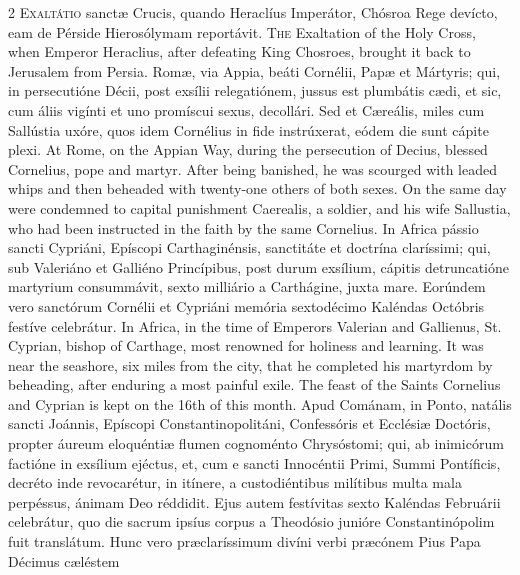 \begin{paracol}{2}
\lettrine[lines=2]{E}{xaltátio} sanctæ Crucis, quando Heracl\'ius Imperátor, Chósroa Rege devícto, eam de Pérside Hierosólymam reportávit.
\switchcolumn
{}
\lettrine[lines=2]{T}{he} Exaltation of the Holy Cross, 
 when Emperor Heraclius, after defeating King Chosroes, brought it back to 
 Jerusalem from Persia.
\switchcolumn*
{}
Romæ, via Appia, beáti 
 Cornélii, Papæ et Mártyris; qui, in persecutióne Décii, post exsílii 
 relegatiónem, jussus est plumbátis cædi, et sic, cum áliis vigínti et uno 
 promíscui sexus, decollári. Sed et Cæreális, miles cum Sallústia uxóre, 
 quos idem Cornélius in fide instrúxerat, eódem die sunt cápite plexi.
\switchcolumn
{}
At Rome, on the Appian Way, during 
 the persecution of Decius, blessed Cornelius, pope and martyr. After 
 being banished, he was scourged with leaded whips and then beheaded with 
 twenty-one others of both sexes. On the same day were condemned to 
 capital punishment Caerealis, a soldier, and his wife Sallustia, who had 
 been instructed in the faith by the same Cornelius.
\switchcolumn*
{}
In Africa pássio sancti 
 Cypriáni, Epíscopi Carthaginénsis, sanctitáte et doctrína claríssimi; qui, 
 sub Valeriáno et Galliéno Princípibus, post durum exsílium, cápitis 
 detruncatióne martyrium consummávit, sexto milliário a Carthágine, juxta 
 mare. Eorúndem vero sanctórum Cornélii et Cypriáni memória sextodécimo 
 Kaléndas Octóbris festíve celebrátur.
\switchcolumn
{}
In Africa, in the time of Emperors 
 Valerian and Gallienus, St. Cyprian, bishop of Carthage, most renowned for 
 holiness and learning. It was near the seashore, six miles from the 
 city, that he completed his martyrdom by beheading, after enduring a most 
 painful exile. The feast of the Saints Cornelius and Cyprian is kept 
 on the 16th of this month.
\switchcolumn*
{}
Apud Cománam, in Ponto, 
 natális sancti Joánnis, Epíscopi Constantinopolitáni, Confessóris et 
 Ecclésiæ Doctóris, propter áureum eloquéntiæ flumen cognoménto Chrysóstomi; 
 qui, ab inimicórum factióne in exsílium ejéctus, et, cum e sancti Innocéntii 
 Primi, Summi Pontíficis, decréto inde revocarétur, in itínere, a 
 custodiéntibus milítibus multa mala perpéssus, ánimam Deo réddidit. 
 Ejus autem festívitas sexto Kaléndas Februárii celebrátur, quo die sacrum 
 ipsíus corpus a Theodósio junióre Constantinópolim fuit translátum. 
 Hunc vero præclaríssimum divíni verbi præcónem Pius Papa Décimus cæléstem 

\end{paracol}
